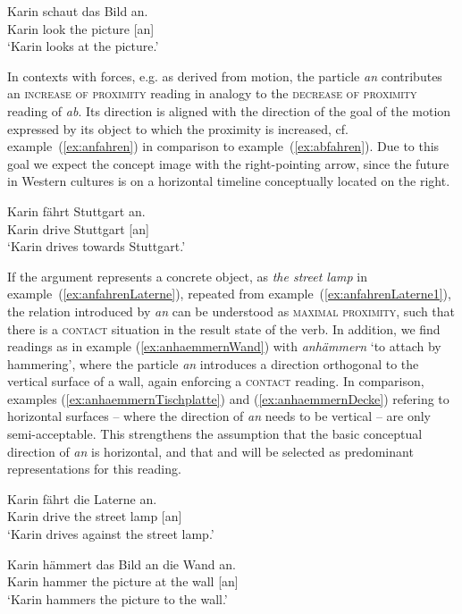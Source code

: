 \documentclass[output=paper]{langsci/langscibook}
\begin{document}
\ea\label{ex:anschauen}
\gll Karin schaut das Bild an.\\
Karin look the picture [an]\\
\glt `Karin looks at the picture.'
\z

In contexts with forces, e.g. as derived from motion, the particle
\textit{an} contributes an \textsc{increase of proximity} reading in
analogy to the \textsc{decrease of proximity} reading of
\textit{ab}. Its direction is aligned with the direction of the goal
of the motion expressed by its object to which the proximity is
increased, cf. example~(\ref{ex:anfahren}) in comparison to
example~(\ref{ex:abfahren}). Due to this goal we expect the concept image
 with the right-pointing arrow, since the future in
Western cultures is on a horizontal timeline conceptually located on
the right.

\ea\label{ex:anfahren}
\gll Karin fährt Stuttgart an.\\
Karin drive Stuttgart [an]\\
\glt `Karin drives towards Stuttgart.'
\z

If the argument represents a concrete object, as \textit{the street lamp}
in example~(\ref{ex:anfahrenLaterne}), repeated from
example~(\ref{ex:anfahrenLaterne1}), the relation introduced by
\textit{an} can be understood as \textsc{maximal proximity}, such that
there is a \textsc{contact} situation in the result state of the
verb. In addition, we find readings as in example
(\ref{ex:anhaemmernWand}) with \textit{anhämmern} `to attach by
hammering', where the particle \textit{an} introduces a direction
orthogonal to the vertical surface of a wall, again enforcing a
\textsc{contact} reading. In comparison, examples
(\ref{ex:anhaemmernTischplatte}) and (\ref{ex:anhaemmernDecke})
refering to horizontal surfaces -- where the direction of \textit{an}
needs to be vertical -- are only semi-acceptable. This strengthens the
assumption that the basic conceptual direction of \textit{an} is
horizontal, and that  and  will
be selected as predominant representations for this reading.

\ea\label{ex:anfahrenLaterne}
\gll Karin fährt die Laterne an.\\
Karin drive the {street lamp} [an]\\
\glt `Karin drives against the street lamp.'
\z

\ea\label{ex:anhaemmernWand}
\gll Karin hämmert das Bild an die Wand an.\\
Karin hammer the picture at the wall [an]\\
\glt `Karin hammers the picture to the wall.'
\z
\end{document}
